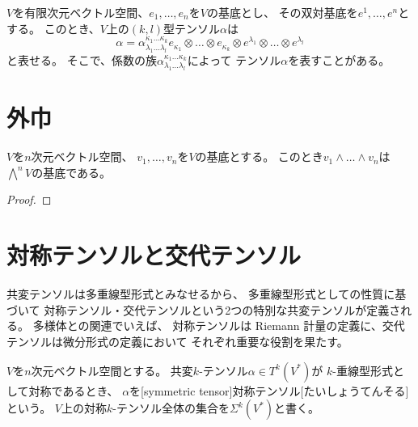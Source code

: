 \documentclass[report]{jlreq}
\begin{document}
\begin{remark}[テンソルの係数による表記]
    $V$を有限次元ベクトル空間、$e_1, \dots, e_n$を$V$の基底とし、
    その双対基底を$e^1, \dots, e^n$とする。
    このとき、$V$上の$(k, l)$型テンソル$\alpha$は
    \begin{equation}
        \alpha = \alpha^{\kappa_1 \dots \kappa_k}_{\lambda_1 \dots \lambda_l}
            e_{\kappa_1} \otimes \dots \otimes e_{\kappa_k}
            \otimes e^{\lambda_1} \otimes \dots \otimes e^{\lambda_l}
    \end{equation}
    と表せる。
    そこで、係数の族$\alpha^{\kappa_1 \dots \kappa_k}_{\lambda_1 \dots \lambda_l}$によって
    テンソル$\alpha$を表すことがある。
\end{remark}

%
\section{外巾}

\begin{definition}[外巾]
    \TODO{}
\end{definition}

\begin{proposition}
    $V$を$n$次元ベクトル空間、
    $v_1, \dots, v_n$を$V$の基底とする。
    このとき$v_1 \wedge \dots \wedge v_n$は$\bigwedge^n V$の基底である。
\end{proposition}

\begin{proof}
\end{proof}

%
\section{対称テンソルと交代テンソル}

共変テンソルは多重線型形式とみなせるから、
多重線型形式としての性質に基づいて
対称テンソル・交代テンソルという2つの特別な共変テンソルが定義される。
多様体との関連でいえば、
対称テンソルは Riemann 計量の定義に、交代テンソルは微分形式の定義において
それぞれ重要な役割を果たす。

\begin{definition}[対称テンソル]
    $V$を$n$次元ベクトル空間とする。
    共変$k$-テンソル$\alpha \in T^k(V^*)$が
    $k$-重線型形式として対称であるとき、
    $\alpha$を[symmetric tensor]{対称テンソル}[たいしょうてんそる]という。
    $V$上の対称$k$-テンソル全体の集合を$\Sigma^k(V^*)$と書く。
\end{definition}
\end{document}
